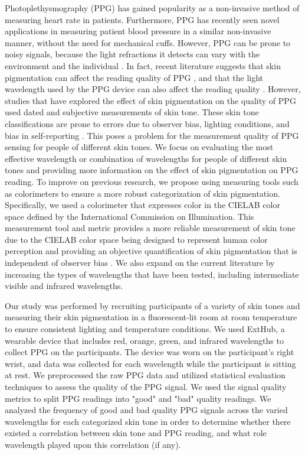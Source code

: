 \documentclass[letterpaper, 10 pt, conference]{ieeeconf}  %
\begin{document}
Photoplethysmography (PPG) has gained popularity as a non-invasive method of measuring heart rate in patients. Furthermore, PPG has recently seen novel applications in measuring patient blood pressure \cite{elgendi_photoplethysmography_2024} in a similar non-invasive manner, without the need for mechanical cuffs. However, PPG can be prone to noisy signals, because the light refractions it detects can vary with the environment and the individual \cite{castaneda_review_2018}. In fact, recent literature suggests that skin pigmentation can affect the reading quality of PPG \cite{al-halawani_review_2023}, and that the light wavelength used by the PPG device can also affect the reading quality \cite{fallow_influence_2013}. However, studies that have explored the effect of skin pigmentation on the quality of PPG used dated and subjective measurements of skin tone. These skin tone classifications are prone to errors due to observer bias, lighting conditions, and bias in self-reporting \cite{vasudevan_melanometry_2024}. This poses a problem for the measurement quality of PPG sensing for people of different skin tones. We focus on evaluating the most effective wavelength or combination of wavelengths for people of different skin tones and providing more information on the effect of skin pigmentation on PPG reading. To improve on previous research, we propose using measuring tools such as colorimeters to ensure a more robust categorization of skin pigmentation. Specifically, we used a colorimeter that expresses color in the CIELAB color space defined by the International Commission on Illumination. This measurement tool and metric provides a more reliable measurement of skin tone due to the CIELAB color space being designed to represent human color perception and providing an objective quantification of skin pigmentation that is independent of observer bias \cite{ly_research_2020}. We also expand on the current literature by increasing the types of wavelengths that have been tested, including intermediate visible and infrared wavelengths. 

Our study was performed by recruiting participants of a variety of skin tones and measuring their skin pigmentation in a fluorescent-lit room at room temperature to ensure consistent lighting and temperature conditions. We used ExtHub, a wearable device that includes red, orange, green, and infrared wavelengths to collect PPG on the participants. The device was worn on the participant’s right wrist, and data was collected for each wavelength while the participant is sitting at rest. We preprocessed the raw PPG data and utilized statistical evaluation techniques to assess the quality of the PPG signal.
We used the signal quality metrics to split PPG readings into "good" and "bad" quality readings. We analyzed the frequency of good and bad quality PPG signals across the varied wavelengths for each categorized skin tone in order to determine whether there existed a correlation between skin tone and PPG reading, and what role wavelength played upon this correlation (if any).
\end{document}
